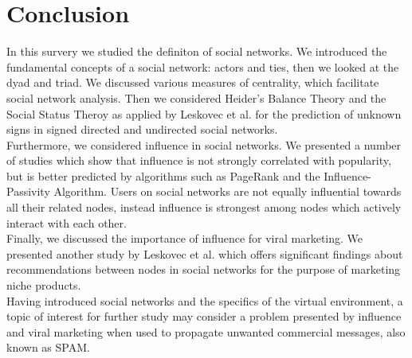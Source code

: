 \documentclass[conference,letterpaper]{IEEEtran}
\begin{document}

\section{Conclusion}

In this survery we studied the definiton of social networks. We introduced the fundamental concepts of
a social network: actors and ties, then we looked at the dyad and triad. We discussed various measures
of centrality, which facilitate social network analysis. Then we considered Heider’s Balance Theory and
the Social Status Theroy as applied by Leskovec et al. for the prediction of unknown signs in signed
directed and undirected social networks. \\
Furthermore, we considered influence in social networks. We presented a number of studies which show
that influence is not strongly correlated with popularity, but is better predicted by algorithms such
as PageRank and the Influence-Passivity Algorithm. Users on social networks are not equally influential
towards all their related nodes, instead influence is strongest among nodes which actively interact with each other.\\
Finally, we discussed the importance of influence for viral marketing. We presented another study by Leskovec et al.
which offers significant findings about recommendations between nodes in social networks for the purpose of marketing
niche products. \\
Having introduced social networks and the specifics of the virtual environment, a topic of interest for further
study may consider a problem presented by influence and viral marketing when used to propagate unwanted commercial messages,
also known as SPAM.\\

\end{document}
